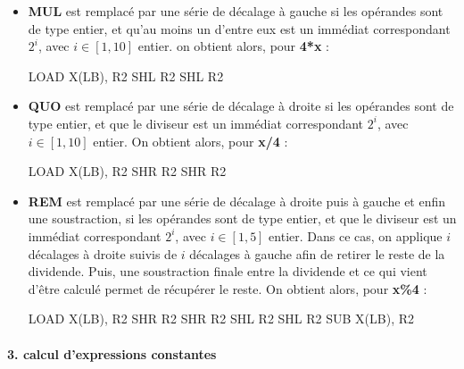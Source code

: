 \documentclass[
]{article}
\newenvironment{Shaded}{}{}
\newcommand{\NormalTok}[1]{#1}
\begin{document}
\begin{itemize}
\item
  \textbf{MUL} est remplacé par une série de décalage à gauche si les
  opérandes sont de type entier, et qu'au moins un d'entre eux est un
  immédiat correspondant \(2^i\), avec \(i \in [1, 10]\) entier. on
  obtient alors, pour \textbf{4*x} :

\begin{Shaded}
\begin{Highlighting}[]
\NormalTok{LOAD X(LB), R2}
\NormalTok{SHL R2}
\NormalTok{SHL R2}
\end{Highlighting}
\end{Shaded}
\item
  \textbf{QUO} est remplacé par une série de décalage à droite si les
  opérandes sont de type entier, et que le diviseur est un immédiat
  correspondant \(2^i\), avec \(i \in [1, 10]\) entier. On obtient
  alors, pour \textbf{x/4} :

\begin{Shaded}
\begin{Highlighting}[]
\NormalTok{LOAD X(LB), R2}
\NormalTok{SHR R2}
\NormalTok{SHR R2}
\end{Highlighting}
\end{Shaded}
\item
  \textbf{REM} est remplacé par une série de décalage à droite puis à
  gauche et enfin une soustraction, si les opérandes sont de type
  entier, et que le diviseur est un immédiat correspondant \(2^i\), avec
  \(i \in [1, 5]\) entier. Dans ce cas, on applique \(i\) décalages à
  droite suivis de \(i\) décalages à gauche afin de retirer le reste de
  la dividende. Puis, une soustraction finale entre la dividende et ce
  qui vient d'être calculé permet de récupérer le reste. On obtient
  alors, pour \textbf{x\%4} :

\begin{Shaded}
\begin{Highlighting}[]
\NormalTok{LOAD X(LB), R2}
\NormalTok{SHR R2}
\NormalTok{SHR R2}
\NormalTok{SHL R2}
\NormalTok{SHL R2}
\NormalTok{SUB X(LB), R2}
\end{Highlighting}
\end{Shaded}
\end{itemize}

\hypertarget{3-calcul-dexpressions-constantes}{%
\paragraph{3. calcul d'expressions
constantes}\label{3-calcul-dexpressions-constantes}}
\end{document}
